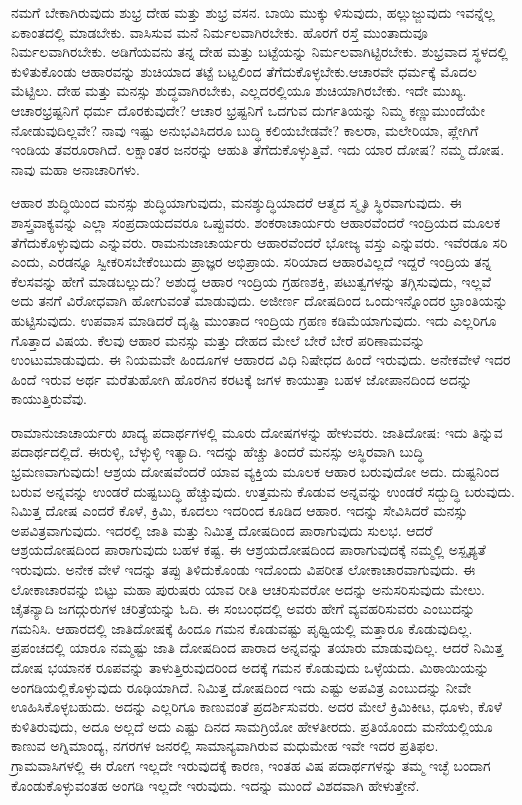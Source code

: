 ನಮಗೆ ಬೇಕಾಗಿರುವುದು ಶುಭ್ರ ದೇಹ ಮತ್ತು ಶುಭ್ರ ವಸನ. ಬಾಯಿ ಮುಕ್ಕು ಳಿಸುವುದು, ಹಲ್ಲುಜ್ಜುವುದು ಇವನ್ನೆಲ್ಲ ಏಕಾಂತದಲ್ಲಿ ಮಾಡಬೇಕು. ವಾಸಿಸುವ ಮನೆ ನಿರ್ಮಲವಾಗಿರಬೇಕು. ಹೊರಗೆ ರಸ್ತೆ ಮುಂತಾದುವೂ ನಿರ್ಮಲವಾಗಿರಬೇಕು. ಅಡಿಗೆ\break ಯವನು ತನ್ನ ದೇಹ ಮತ್ತು ಬಟ್ಟೆಯನ್ನು ನಿರ್ಮಲವಾಗಿಟ್ಟಿರಬೇಕು. ಶುಭ್ರವಾದ ಸ್ಥಳದಲ್ಲಿ ಕುಳಿತುಕೊಂಡು ಆಹಾರವನ್ನು ಶುಚಿಯಾದ ತಟ್ಟೆ ಬಟ್ಟಲಿಂದ ತೆಗೆದುಕೊಳ್ಳಬೇಕು.ಆಚಾರವೇ ಧರ್ಮಕ್ಕೆ ಮೊದಲ ಮೆಟ್ಟಿಲು. ದೇಹ ಮತ್ತು ಮನಸ್ಸು ಶುದ್ಧವಾಗಿರಬೇಕು, ಎಲ್ಲದರಲ್ಲಿಯೂ ಶುಚಿಯಾಗಿರಬೇಕು. ಇದೇ ಮುಖ್ಯ. ಆಚಾರಭ್ರಷ್ಟನಿಗೆ ಧರ್ಮ ದೊರಕುವುದೇ? ಆಚಾರ ಭ್ರಷ್ಟನಿಗೆ ಒದಗುವ ದುರ್ಗತಿಯನ್ನು ನಿಮ್ಮ ಕಣ್ಣುಮುಂದೆಯೇ ನೋಡುವುದಿಲ್ಲವೇ? ನಾವು ಇಷ್ಟು ಅನುಭವಿಸಿದರೂ ಬುದ್ಧಿ ಕಲಿಯಬೇಡವೇ? ಕಾಲರಾ, ಮಲೇರಿಯಾ, ಪ್ಲೇಗಿಗೆ ಇಂಡಿಯ ತವರೂರಾಗಿದೆ. ಲಕ್ಷಾಂತರ ಜನರನ್ನು ಆಹುತಿ ತೆಗೆದುಕೊಳ್ಳುತ್ತಿವೆ. ಇದು ಯಾರ ದೋಷ? ನಮ್ಮ ದೋಷ. ನಾವು ಮಹಾ ಅನಾಚಾರಿಗಳು.

ಆಹಾರ ಶುದ್ಧಿಯಿಂದ ಮನಸ್ಸು ಶುದ್ಧಿಯಾಗುವುದು, ಮನಶ್ಶುದ್ಧಿಯಾದರೆ ಆತ್ಮದ ಸ್ಮೃತಿ ಸ್ಥಿರವಾಗುವುದು. ಈ ಶಾಸ್ತ್ರವಾಕ್ಯವನ್ನು ಎಲ್ಲಾ ಸಂಪ್ರದಾಯದವರೂ ಒಪ್ಪುವರು.\- ಶಂಕರಾಚಾರ್ಯರು ಆಹಾರವೆಂದರೆ ಇಂದ್ರಿಯದ ಮೂಲಕ ತೆಗೆದುಕೊಳ್ಳುವುದು ಎನ್ನುವರು. ರಾಮನುಜಾಚಾರ್ಯರು ಆಹಾರವೆಂದರೆ ಭೋಜ್ಯ ವಸ್ತು ಎನ್ನುವರು. ಇವೆರಡೂ ಸರಿ ಎಂದು, ಎರಡನ್ನೂ ಸ್ವೀಕರಿಸಬೇಕೆಂಬುದು ಪ್ರಾಜ್ಞರ ಅಭಿಪ್ರಾಯ. ಸರಿಯಾದ ಆಹಾರವಿಲ್ಲದೆ ಇದ್ದರೆ ಇಂದ್ರಿಯ ತನ್ನ ಕೆಲಸವನ್ನು ಹೇಗೆ ಮಾಡಬಲ್ಲುದು? ಅಶುದ್ಧ ಆಹಾರ ಇಂದ್ರಿಯ ಗ್ರಹಣಶಕ್ತಿ, ಪಟುತ್ವಗಳನ್ನು ತಗ್ಗಿಸುವುದು, ಇಲ್ಲವೆ ಅದು ತನಗೆ ವಿರೋಧವಾಗಿ ಹೋಗುವಂತೆ ಮಾಡುವುದು. ಅಜೀರ್ಣ ದೋಷದಿಂದ ಒಂದು\break ಇನ್ನೊಂದರ ಭ್ರಾಂತಿಯನ್ನು ಹುಟ್ಟಿಸುವುದು. ಉಪವಾಸ ಮಾಡಿದರೆ ದೃಷ್ಟಿ ಮುಂತಾದ ಇಂದ್ರಿಯ ಗ್ರಹಣ ಕಡಿಮೆಯಾಗುವುದು. ಇದು ಎಲ್ಲರಿಗೂ ಗೊತ್ತಾದ ವಿಷಯ. ಕೆಲವು ಆಹಾರ ಮನಸ್ಸು ಮತ್ತು ದೇಹದ ಮೇಲೆ ಬೇರೆ ಬೇರೆ ಪರಿಣಾಮವನ್ನು ಉಂಟುಮಾಡುವುದು. ಈ ನಿಯಮವೇ ಹಿಂದೂಗಳ ಆಹಾರದ ವಿಧಿ ನಿಷೇಧದ ಹಿಂದೆ ಇರುವುದು. ಅನೇಕವೇಳೆ ಇದರ ಹಿಂದೆ ಇರುವ ಅರ್ಥ ಮರೆತುಹೋಗಿ ಹೊರಗಿನ ಕರಟಕ್ಕೆ ಜಗಳ ಕಾಯುತ್ತಾ ಬಹಳ ಜೋಪಾನದಿಂದ ಅದನ್ನು ಕಾಯುತ್ತಿರುವೆವು.

ರಾಮಾನುಜಾಚಾರ್ಯರು ಖಾದ್ಯ ಪದಾರ್ಥಗಳಲ್ಲಿ ಮೂರು ದೋಷಗಳನ್ನು ಹೇಳುವರು. ಜಾತಿದೋಷ: ಇದು ತಿನ್ನುವ ಪದಾರ್ಥದಲ್ಲಿದೆ. ಈರುಳ್ಳಿ, ಬೆಳ್ಳುಳ್ಳಿ ಇತ್ಯಾದಿ. ಇದನ್ನು ಹೆಚ್ಚು ತಿಂದರೆ ಮನಸ್ಸು ಅಸ್ಥಿರವಾಗಿ ಬುದ್ಧಿ ಭ್ರಮಣವಾಗುವುದು! ಆಶ್ರಯ ದೋಷವೆಂದರೆ ಯಾವ ವ್ಯಕ್ತಿಯ ಮೂಲಕ ಆಹಾರ ಬರುವುದೋ ಅದು. ದುಷ್ಟನಿಂದ ಬರುವ ಅನ್ನವನ್ನು ಉಂಡರೆ ದುಷ್ಟಬುದ್ಧಿ ಹೆಚ್ಚುವುದು. ಉತ್ತಮನು ಕೊಡುವ ಅನ್ನವನ್ನು ಉಂಡರೆ ಸದ್ಬುದ್ಧಿ ಬರುವುದು. ನಿಮಿತ್ತ ದೋಷ ಎಂದರೆ ಕೊಳೆ, ಕ್ರಿಮಿ, ಕೂದಲು ಇದರಿಂದ ಕೂಡಿದ ಆಹಾರ. ಇದನ್ನು ಸೇವಿಸಿದರೆ ಮನಸ್ಸು ಅಪವಿತ್ರವಾಗುವುದು. ಇದರಲ್ಲಿ ಜಾತಿ ಮತ್ತು ನಿಮಿತ್ತ ದೋಷದಿಂದ ಪಾರಾಗುವುದು ಸುಲಭ. ಆದರೆ ಆಶ್ರಯದೋಷದಿಂದ ಪಾರಾಗುವುದು ಬಹಳ ಕಷ್ಟ. ಈ ಆಶ್ರಯದೋಷದಿಂದ ಪಾರಾಗುವುದಕ್ಕೆ ನಮ್ಮಲ್ಲಿ ಅಸ್ಪೃಶ್ಯತೆ ಇರುವುದು. ಅನೇಕ ವೇಳೆ ಇದನ್ನು ತಪ್ಪು ತಿಳಿದುಕೊಂಡು ಇದೊಂದು ವಿಪರೀತ ಲೋಕಾಚಾರವಾಗುವುದು. ಈ ಲೋಕಾಚಾರವನ್ನು ಬಿಟ್ಟು ಮಹಾ ಪುರುಷರು ಯಾವ ರೀತಿ ಆಚರಿಸುವರೋ ಅದನ್ನು ಅನುಸರಿಸುವುದು ಮೇಲು. ಚೈತನ್ಯಾದಿ ಜಗದ್ಗುರುಗಳ ಚರಿತ್ರೆಯನ್ನು ಓದಿ. ಈ ಸಂಬಂಧದಲ್ಲಿ ಅವರು ಹೇಗೆ ವ್ಯವಹರಿಸುವರು ಎಂಬುದನ್ನು ಗಮನಿಸಿ. ಆಹಾರದಲ್ಲಿ ಜಾತಿದೋಷಕ್ಕೆ ಹಿಂದೂ ಗಮನ ಕೊಡುವಷ್ಟು ಪೃಥ್ವಿಯಲ್ಲಿ ಮತ್ತಾರೂ ಕೊಡುವುದಿಲ್ಲ. ಪ್ರಪಂಚದಲ್ಲಿ ಯಾರೂ ನಮ್ಮಷ್ಟು ಜಾತಿ ದೋಷದಿಂದ ಪಾರಾದ ಅನ್ನವನ್ನು ತಯಾರು ಮಾಡುವುದಿಲ್ಲ. ಆದರೆ ನಿಮಿತ್ತ ದೋಷ ಭಯಾನಕ ರೂಪವನ್ನು ತಾಳುತ್ತಿರುವುದರಿಂದ ಅದಕ್ಕೆ ಗಮನ ಕೊಡುವುದು ಒಳ್ಳೆಯದು. ಮಿಠಾಯಿಯನ್ನು ಅಂಗಡಿಯಲ್ಲಿಕೊಳ್ಳುವುದು ರೂಢಿಯಾಗಿದೆ. ನಿಮಿತ್ತ ದೋಷದಿಂದ ಇದು ಎಷ್ಟು ಅಪವಿತ್ರ ಎಂಬುದನ್ನು ನೀವೇ ಊಹಿಸಿಕೊಳ್ಳಬಹುದು. ಅದನ್ನು ಎಲ್ಲರಿಗೂ ಕಾಣುವಂತೆ ಪ್ರದರ್ಶಿಸುವರು. ಅದರ ಮೇಲೆ ಕ್ರಿಮಿಕೀಟ, ಧೂಳು, ಕೊಳೆ ಕುಳಿತಿರುವುದು, ಅದೂ ಅಲ್ಲದೆ ಅದು ಎಷ್ಟು ದಿನದ ಸಾಮಗ್ರಿಯೋ ಹೇಳತೀರದು. ಪ್ರತಿಯೊಂದು ಮನೆಯಲ್ಲಿಯೂ ಕಾಣುವ ಅಗ್ನಿಮಾಂದ್ಯ, ನಗರಗಳ ಜನರಲ್ಲಿ ಸಾಮಾನ್ಯವಾಗಿರುವ ಮಧುಮೇಹ ಇವೇ ಇದರ ಪ್ರತಿಫಲ. ಗ್ರಾಮವಾಸಿಗಳಲ್ಲಿ ಈ ರೋಗ ಇಲ್ಲದೇ ಇರುವುದಕ್ಕೆ ಕಾರಣ, ಇಂತಹ ವಿಷ ಪದಾರ್ಥಗಳನ್ನು ತಮ್ಮ ಇಚ್ಛೆ ಬಂದಾಗ ಕೊಂಡುಕೊಳ್ಳುವಂತಹ ಅಂಗಡಿ ಇಲ್ಲದೇ ಇರುವುದು. ಇದನ್ನು ಮುಂದೆ ವಿಶದವಾಗಿ ಹೇಳುತ್ತೇನೆ.

